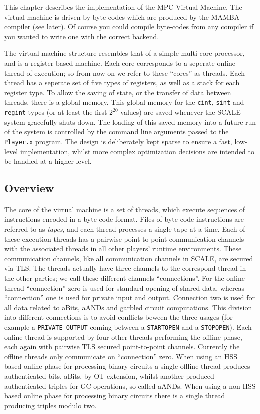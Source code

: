 
\label{sec:vm}

This chapter describes the implementation of the
MPC Virtual Machine.
The virtual machine is driven by byte-codes which
are produced by the MAMBA compiler (see later).
Of course you could compile byte-codes from any compiler
if you wanted to write one with the correct backend.

The virtual machine structure resembles that of a
simple multi-core processor, and is a register-based
machine.
Each core corresponds to a seperate online thread
of execution; so from now on we refer to these ``cores''
as threads.
Each thread has a seperate set of five types of registers, as
well as a stack for each register type.
To allow the saving of state, or the transfer of data
between threads, there is a global memory.
This global memory for the \verb|cint|, \verb|sint| and \verb|regint| types
(or at least the first $2^{20}$ values) are saved whenever the 
SCALE system gracefully shuts down.
The loading of this saved memory into a future run of the
system is controlled by the command line arguments
passed to the \verb+Player.x+ program.
The design is deliberately kept sparse to ensure a fast, low-level
implementation, whilst more complex optimization decisions are intended
to be handled at a higher level.

\subsection{Overview}

The core of the virtual machine is a set of threads, which
execute sequences of instructions encoded in a byte-code format.
Files of byte-code instructions are referred to as \emph{tapes},
and each thread processes a single tape at a time.
Each of these execution threads has a pairwise point-to-point
communication channels with the associated threads in all
other players' runtime environments.
These communication channels, like all communication channels
in SCALE, are secured via TLS.
The threads actually have three channels to the correspond
thread in the other parties; we call these different channels
``connections''.
For the online thread ``connection'' zero is used for standard
opening of shared data, whereas ``connection'' one is used for
private input and output.
Connection two is used for all data related to aBits, aANDs
and garbled circuit computations.
This division into different connections is to avoid conflicts beween
the three usages (for example a \verb+PRIVATE_OUTPUT+ coming between
a \verb+STARTOPEN+ and a \verb+STOPOPEN+).
Each online thread is supported by four other threads
performing the offline phase, each again with pairwise
TLS secured point-to-point channels. Currently the offline
threads only communicate on ``connection'' zero.
When using an HSS based online phase for processing binary circuits
a single offline thread produces authenticated bits, aBits,
by OT-extension, whilst another produced authenticated
triples for GC operations, so called aANDs.
When using a non-HSS based online phase for processing binary circuits
there is a single thread producing triples modulo two.

